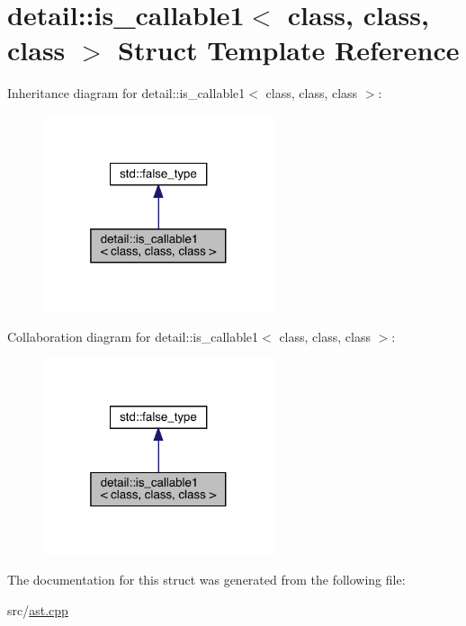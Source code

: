 \hypertarget{structdetail_1_1is__callable1}{}\section{detail\+:\+:is\+\_\+callable1$<$ class, class, class $>$ Struct Template Reference}
\label{structdetail_1_1is__callable1}


Inheritance diagram for detail\+:\+:is\+\_\+callable1$<$ class, class, class $>$\+:\nopagebreak
\begin{figure}[H]
\begin{center}
\leavevmode
\includegraphics[width=193pt]{structdetail_1_1is__callable1__inherit__graph}
\end{center}
\end{figure}


Collaboration diagram for detail\+:\+:is\+\_\+callable1$<$ class, class, class $>$\+:\nopagebreak
\begin{figure}[H]
\begin{center}
\leavevmode
\includegraphics[width=193pt]{structdetail_1_1is__callable1__coll__graph}
\end{center}
\end{figure}


The documentation for this struct was generated from the following file\+:\begin{DoxyCompactItemize}
\item 
src/\hyperlink{ast_8cpp}{ast.\+cpp}\end{DoxyCompactItemize}
